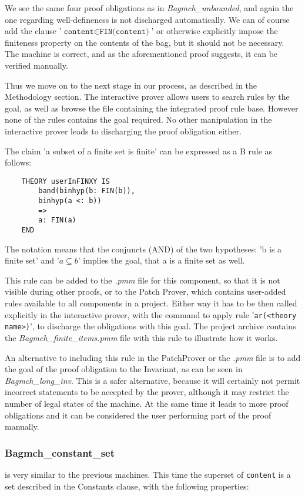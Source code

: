 \documentclass[11pt,journal]{IEEEtran}
\begin{document}
	We see the same four proof obligations as in \emph{Bagmch\_unbounded}, and again the one regarding well-defineness is not discharged automatically. We can of course add the clause '$\texttt{content} \in \texttt{FIN(content)}$' or otherwise explicitly impose the finiteness property on the contents of the bag, but it should not be necessary. The machine is correct, and as the aforementioned proof suggests, it can be verified manually.
	
	Thus we move on to the next stage in our process, as described in the Methodology section. The interactive prover allows users to search rules by the goal, as well as browse the file containing the integrated proof rule base. However none of the rules contains the goal required. No other manipulation in the interactive prover leads to discharging the proof obligation either.
	
	The claim 'a subset of a finite set is finite' can be expressed as a B rule as follows:
		
	\begin{lstlisting}
	THEORY userInFINXY IS
		band(binhyp(b: FIN(b)), 
		binhyp(a <: b))
		=>
		a: FIN(a)
	END
	\end{lstlisting}
	
	The notation means that the conjuncts (AND) of the two hypotheses: 'b is a finite set' and '$a \subseteq b$' implies the goal, that a is a finite set as well.
	
	This rule can be added to the \emph{.pmm} file for this component, so that it is not visible during other proofs, or to the Patch Prover, which contains user-added rules available to all components in a project. Either way it has to be then called explicitly in the interactive prover, with the command to apply rule '\texttt{ar(<theory name>)}', to discharge the obligations with this goal. The project archive contains the \emph{Bagmch\_finite\_items.pmm} file with this rule to illustrate how it works. 
	
	An alternative to including this rule in the PatchProver or the \emph{.pmm} file is to add the goal of the proof obligation to the Invariant, as can be seen in \emph{Bagmch\_long\_inv}. This is a safer alternative, because it will certainly not permit incorrect statements to be accepted by the prover, although it may restrict the number of legal states of the machine. At the same time it leads to more proof obligations and it can be considered the user performing part of the proof manually.
	
	\subsubsection{Bagmch\_constant\_set} is very similar to the previous machines. This time the superset of \texttt{content} is a set described in the Constants clause, with the following properties:
	
\end{document}
